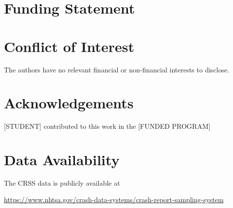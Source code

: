 \documentclass[fleqn]{cas-sc}
\begin{document}
\section*{Funding Statement}

\section*{Conflict of Interest}

The authors have no relevant financial or non-financial interests to disclose.

\section*{Acknowledgements}

[STUDENT]
contributed to this work in the 
[FUNDED PROGRAM]

\section*{Data Availability}

The CRSS data is publicly available at 

\url{https://www.nhtsa.gov/crash-data-systems/crash-report-sampling-system}


\begin{comment}
\begin{figure}[<options>]
	\centering
		\texttt{[image: ]}
	  \caption{}\label{fig1}
\end{figure}


\begin{table}[<options>]
\caption{}\label{tbl1}
\begin{tabular*}{\tblwidth}{@{}LL@{}}
\toprule
  &  \\ %
\midrule
 & \\
 & \\
 & \\
 & \\
\bottomrule
\end{tabular*}
\end{table}
\end{comment}

\end{document}
